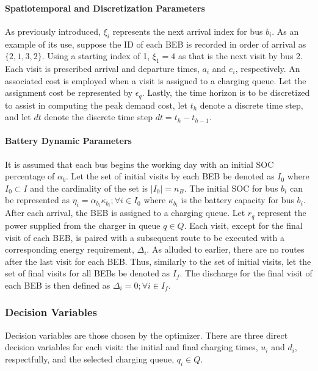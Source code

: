 \documentclass[ee,thesis]{usuthesis}
\newcommand{\Iset}{I}                       %
\newcommand{\Isetinit}{I_0}                 %
\newcommand{\Isetfinal}{I_f}                %
\newcommand{\Qset}{Q}                       %
\begin{document}
\paragraph{Spatiotemporal and Discretization Parameters}
\label{sec:sa-packing-and-discretization-paramaters}
As previously introduced, \(\xi_i\) represents the next arrival index for bus \(b_i\). As an example of its use, suppose the
ID of each BEB is recorded in order of arrival as \(\{ 2,1,3,2 \}\). Using a starting index of 1, \(\xi_1 = 4\) as that is the
next visit by bus 2. Each visit is prescribed arrival and departure times, \(a_i\) and \(e_i\), respectively. An associated
cost is employed when a visit is assigned to a charging queue. Let the assignment cost be represented by \(\epsilon_q\). Lastly,
the time horizon is to be discretized to assist in computing the peak demand cost, let \(t_h\) denote a discrete time
step, and let \(dt\) denote the discrete time step \(dt = t_h - t_{h-1}\).

\paragraph{Battery Dynamic Parameters}
\label{sec:sa-battery-dynamic-parameters}
It is assumed that each bus begins the working day with an initial SOC percentage of \(\alpha_b\). Let the set of initial
visits by each BEB be denoted as \(\Isetinit\) where \(\Isetinit \subset \Iset\) and the cardinality of the set is \(\lvert
\Isetinit \rvert = n_B\). The initial SOC for bus \(b_i\) can be represented as \(\eta_{i} = \alpha_{b_i}\kappa_{b_i}; \forall i \in \Isetinit\)
where \(\kappa_{b_i}\) is the battery capacity for bus \(b_i\). After each arrival, the BEB is assigned to a charging queue. Let
\(r_q\) represent the power supplied from the charger in queue \(q \in Q\). Each visit, except for the final visit of each
BEB, is paired with a subsequent route to be executed with a corresponding energy requirement, \(\Delta_i\). As alluded to
earlier, there are no routes after the last visit for each BEB. Thus, similarly to the set of initial visits, let the
set of final visits for all BEBs be denoted as \(\Isetfinal\). The discharge for the final visit of each BEB is then
defined as \(\Delta_{i} = 0; \forall i \in \Isetfinal\).

\subsubsection{Decision Variables}
\label{sec:sa-decision-variables}
Decision variables are those chosen by the optimizer. There are three direct decision variables for each visit: the
initial and final charging times, \(u_i\) and \(d_i\), respectfully, and the selected charging queue, \(q_i \in \Qset\).
\end{document}
